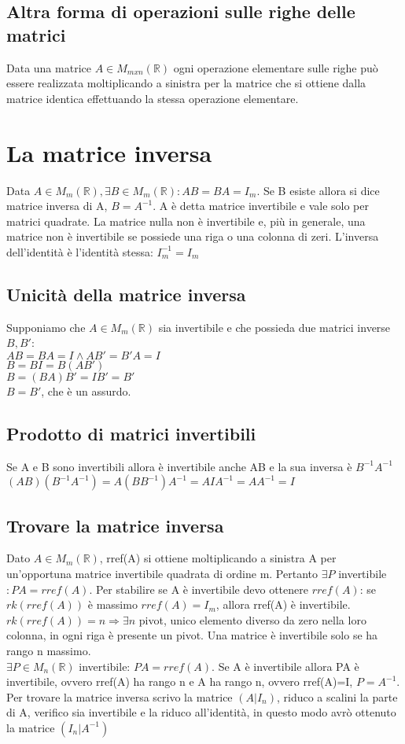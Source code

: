\subsection{Altra forma di operazioni sulle righe delle matrici}
Data una matrice $A\in M_{mxn} (\mathbb{R})$ ogni operazione elementare sulle righe pu\`o essere realizzata moltiplicando a sinistra per la matrice che si ottiene dalla 
matrice identica effettuando la stessa operazione elementare.
\section{La matrice inversa}
Data $A\in M_{m} (\mathbb{R}),\exists B\in M_{m} (\mathbb{R}): AB=BA=I_m$. Se B esiste allora si dice matrice inversa di A, $B=A^{-1}$. A \`e detta matrice invertibile e vale
solo per matrici quadrate. La matrice nulla non \`e invertibile e, pi\`u in generale, una matrice non \`e invertibile se possiede una riga o una colonna di zeri. L'inversa 
dell'identit\`a \`e l'identit\`a stessa: $I_m^{-1}=I_m$
\subsection{Unicit\`a della matrice inversa}
Supponiamo che $A\in M_{m} (\mathbb{R})$ sia invertibile e che possieda due matrici inverse $B,B'$:\\
$AB=BA=I\wedge AB'=B'A=I$\\
$B=BI=B(AB')$\\
$B=(BA)B'=IB'=B'$\\
$B=B'$, che \`e un assurdo.
\subsection{Prodotto di matrici invertibili}
Se A e B sono invertibili allora \`e invertibile anche AB e la sua inversa \`e $B^{-1}A^{-1}$\\
$(AB)(B^{-1}A^{-1})=A(BB^{-1})A^{-1}=AIA^{-1}=AA^{-1}=I$
\subsection{Trovare la matrice inversa}
Dato $A\in M_{m} (\mathbb{R})$, rref(A) si ottiene moltiplicando a sinistra A per un'opportuna matrice invertibile quadrata di ordine m. Pertanto $\exists P$ invertibile$: 
PA=rref(A)$. Per stabilire se A \`e invertibile devo ottenere $rref(A)$: se  $rk(rref(A))$ \`e massimo $rref(A)=I_m$, allora rref(A) \`e invertibile. $rk(rref(A))=n\Rightarrow
\exists n$ pivot, unico elemento diverso da zero nella loro colonna, in ogni riga \`e presente un pivot. Una matrice \`e invertibile solo se ha rango n massimo.\\
$\exists P\in M_n (\mathbb{R})$ invertibile: $PA=rref(A)$. Se A \`e invertibile allora PA \`e invertibile, ovvero rref(A) ha rango n e A ha rango n, ovvero rref(A)=I, 
$P=A^{-1}$. Per trovare la matrice inversa scrivo la matrice $(A|I_n)$, riduco a scalini la parte di A, verifico sia invertibile e la riduco all'identit\`a, in questo modo
avr\`o ottenuto la matrice $(I_n|A^{-1})$
